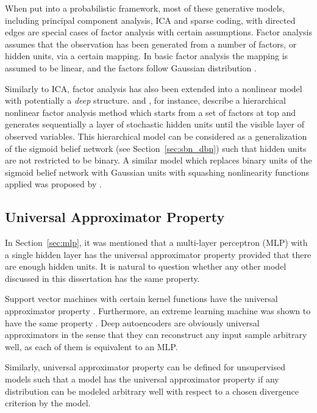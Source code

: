 \documentclass[dissertation,nocontribution,draft*]{aaltoseries}
\begin{document}
When put into a probabilistic framework, most of these
generative models, including principal component analysis,
ICA and sparse coding, with directed edges are special cases
of factor analysis with certain assumptions. Factor analysis
assumes that the observation has been generated from a
number of factors, or hidden units, via a certain mapping.
In basic factor analysis the mapping is
assumed to be linear, and the factors follow Gaussian
distribution \citep[see, e.g.,][and references
therein]{Bishop2006}. 

Similarly to ICA, factor analysis has also been extended
into a nonlinear model with potentially a \textit{deep}
structure. \citet{Raiko2001} and \citet{Raiko2007}, for instance,
describe a hierarchical nonlinear factor analysis method which
starts from a set of factors at top and generates
sequentially a layer of stochastic hidden units until the
visible layer of observed variables. This hierarchical model
can be considered as a generalization of the sigmoid belief
network (see Section~\ref{sec:sbn_dbn}) such that hidden
units are not restricted to be binary. A similar model which
replaces binary units of the sigmoid belief network with
Gaussian units with squashing nonlinearity functions applied
was proposed by \citet{Frey1999}.

\subsection{Universal Approximator Property}
\label{sec:uap}

In Section~\ref{sec:mlp}, it was mentioned that a
multi-layer perceptron (MLP) with a single hidden layer has
the universal approximator property provided that there are
enough hidden units. %
It is natural to question whether any other model
discussed in this dissertation has the same property. 

Support vector machines with certain kernel functions have
the universal approximator property \citep{Hammer2003}.
Furthermore, an extreme learning machine was shown to have
the same property \citep{Huang2006tnn}. Deep autoencoders are
obviously universal approximators in the sense that they can
reconstruct any input sample arbitrary well, as each of them
is equivalent to an MLP.

Similarly, universal approximator property can be defined
for unsupervised models such that a model has the universal
approximator property if any distribution can be modeled
arbitrary well with respect to a chosen divergence
criterion by the model.
\end{document}
